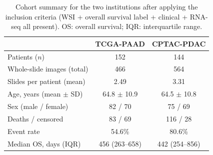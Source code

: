 \begin{table}[htbp]
  \centering
  \begin{tabular}{@{}l c c@{}}
    \toprule
    & \textbf{TCGA-PAAD} & \textbf{CPTAC-PDAC} \\
    \midrule
    Patients ($n$)                      & 152             & 144             \\
    Whole-slide images (total)          & 466              & 564              \\
    Slides per patient (mean)           & 2.49             & 3.31             \\
    Age, years (mean $\pm$ SD)          & 64.8 $\pm$ 10.9  & 64.5 $\pm$ 10.8  \\
    Sex (male / female)                 & 82 / 70          & 75 / 69          \\
    Deaths / censored                   & 83 / 69          & 116 / 28         \\
    Event rate                          & 54.6\%           & 80.6\%           \\
    Median OS, days (IQR)               & 456 (263--658)   & 442 (254--856)   \\
    \bottomrule
  \end{tabular}
  \caption{Cohort summary for the two institutions after applying the inclusion
    criteria (WSI + overall survival label + clinical + RNA-seq all present).
    OS: overall survival; IQR: interquartile range.}
  \label{tab:cohort-summary}
\end{table}
